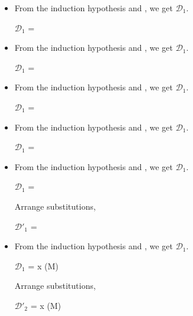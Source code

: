 \begin{itemize}
	\item \QCsp

	From the induction hypothesis and \QCsp, we get $\mathcal{D}_1$.

	$\mathcal{D}_1$ = 
	{}

	\item \QRefl

	From the induction hypothesis and \QRefl, we get $\mathcal{D}_1$.

	$\mathcal{D}_1$ = 
	{}

	\item \QSym

	From the induction hypothesis and \QSym, we get $\mathcal{D}_1$.

	$\mathcal{D}_1$ = 
	{}

	\item \QTrans

	From the induction hypothesis and \QTrans, we get $\mathcal{D}_1$.

	$\mathcal{D}_1$ = 
	{ \andalso {}}

	\item \QBeta

	From the induction hypothesis and \QBeta, we get $\mathcal{D}_1$.

	$\mathcal{D}_1$ = 
	{ \andalso {}}

	Arrange substitutions,

	$\mathcal{D}'_1$ = 
	{ \andalso {}}

	\item \QEta

	From the induction hypothesis and \QEta, we get $\mathcal{D}_1$.

	$\mathcal{D}_1$ = 
	{ \andalso x \notin \FV(M\SB)}

	Arrange substitutions,

	$\mathcal{D}'_2$ = 
	{ \andalso x \notin \FV(M\SB)}


\end{itemize}
